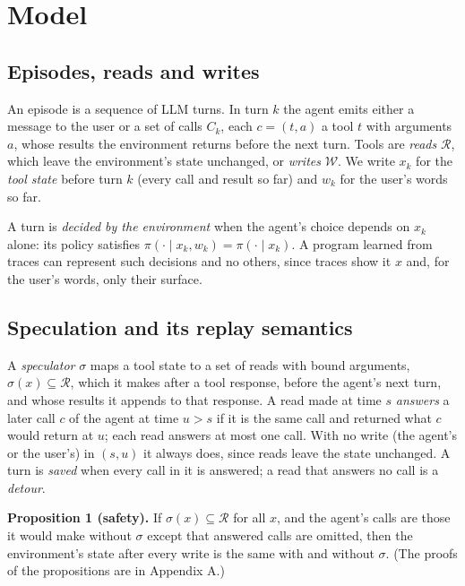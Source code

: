 \documentclass[10pt,twocolumn,letterpaper]{article}
\newcommand{\runin}[1]{{\sffamily\bfseries\color{accent}#1}}
\begin{document}
\hypertarget{model}{%
\section{Model}\label{model}}

\hypertarget{episodes-reads-and-writes}{%
\subsection{Episodes, reads and writes}\label{episodes-reads-and-writes}}

An episode is a sequence of LLM turns. In turn \(k\) the agent emits either a message to the user or a set of calls \(C_k\), each \(c = (t, a)\) a tool \(t\) with arguments \(a\), whose results the environment returns before the next turn. Tools are \emph{reads} \(\mathcal R\), which leave the environment's state unchanged, or \emph{writes} \(\mathcal W\). We write \(x_k\) for the \emph{tool state} before turn \(k\) (every call and result so far) and \(w_k\) for the user's words so far.

A turn is \emph{decided by the environment} when the agent's choice depends on \(x_k\) alone: its policy satisfies \(\pi(\cdot \mid x_k, w_k) = \pi(\cdot \mid x_k)\). A program learned from traces can represent such decisions and no others, since traces show it \(x\) and, for the user's words, only their surface.

\hypertarget{speculation-and-its-replay-semantics}{%
\subsection{Speculation and its replay semantics}\label{speculation-and-its-replay-semantics}}

A \emph{speculator} \(\sigma\) maps a tool state to a set of reads with bound arguments, \(\sigma(x) \subseteq \mathcal R\), which it makes after a tool response, before the agent's next turn, and whose results it appends to that response. A read made at time \(s\) \emph{answers} a later call \(c\) of the agent at time \(u > s\) if it is the same call and returned what \(c\) would return at \(u\); each read answers at most one call. With no write (the agent's or the user's) in \((s, u)\) it always does, since reads leave the state unchanged. A turn is \emph{saved} when every call in it is answered; a read that answers no call is a \emph{detour}.

\begin{prop}
\runin{Proposition 1 (safety).} If \(\sigma(x) \subseteq \mathcal R\) for all \(x\), and the agent's calls are those it would make without \(\sigma\) except that answered calls are omitted, then the environment's state after every write is the same with and without \(\sigma\). (The proofs of the propositions are in Appendix A.)
\end{prop}
\end{document}
